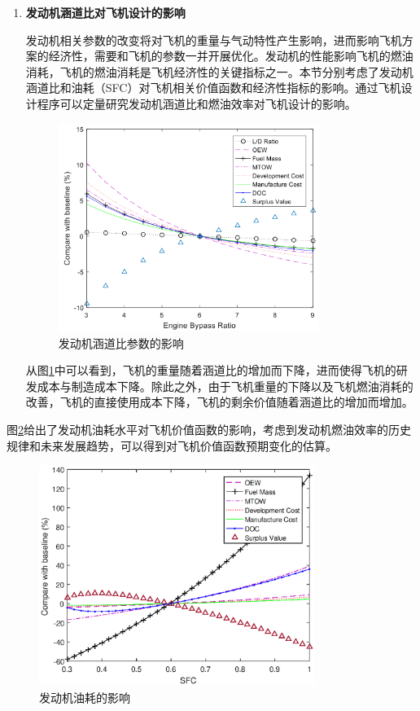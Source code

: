 \documentclass[12pt,a4paper]{report}
\begin{document}
\begin{enumerate}
\item \textbf{发动机涵道比对飞机设计的影响}

发动机相关参数的改变将对飞机的重量与气动特性产生影响，进而影响飞机方案的经济性，需要和飞机的参数一并开展优化。发动机的性能影响飞机的燃油消耗，飞机的燃油消耗是飞机经济性的关键指标之一。本节分别考虑了发动机涵道比和油耗（SFC）对飞机相关价值函数和经济性指标的影响。通过飞机设计程序可以定量研究发动机涵道比和燃油效率对飞机设计的影响。

\begin{figure}[htp]
  \centering
  \includegraphics[width=0.8\textwidth]{./media4/bypassratio.png}
  \caption{发动机涵道比参数的影响}
  \label{fig:bypassratio}
\end{figure}
从图\ref{fig:bypassratio}中可以看到，飞机的重量随着涵道比的增加而下降，进而使得飞机的研发成本与制造成本下降。除此之外，由于飞机重量的下降以及飞机燃油消耗的改善，飞机的直接使用成本下降，飞机的剩余价值随着涵道比的增加而增加。
\end{enumerate}

图\ref{fig:sfc}给出了发动机油耗水平对飞机价值函数的影响，考虑到发动机燃油效率的历史规律和未来发展趋势，可以得到对飞机价值函数预期变化的估算。
\begin{figure}[htp]
  \centering
  \includegraphics[width=0.8\textwidth]{./media4/SFC.eps}
  \caption{发动机油耗的影响}
  \label{fig:sfc}
\end{figure}
\end{document}
